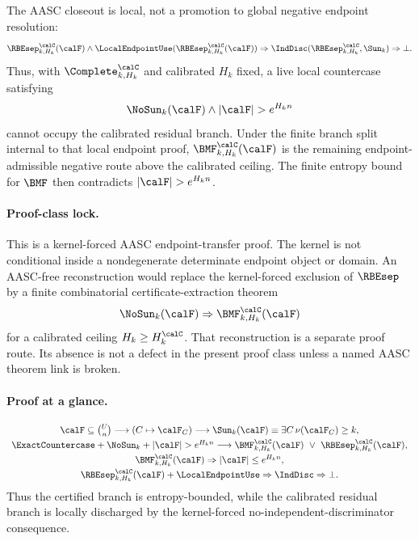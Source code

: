 \documentclass[11pt]{article}
\begin{document}
The AASC closeout is local, not a promotion to global negative endpoint resolution:
\[
  \RBEsep^{\calC}_{k,H_k}(\calF)\wedge \LocalEndpointUse(\RBEsep^{\calC}_{k,H_k}(\calF))
  \Rightarrow
  \IndDisc(\RBEsep^{\calC}_{k,H_k},\Sun_k)
  \Rightarrow \bot.
\]
Thus, with \(\Complete^{\calC}_{k,H_k}\) and calibrated \(H_k\) fixed, a live local countercase satisfying
\[
  \NoSun_k(\calF)\wedge |\calF|>e^{H_k n}
\]
cannot occupy the calibrated residual branch.  Under the finite branch split internal to that local endpoint proof, \(\BMF^{\calC}_{k,H_k}(\calF)\) is the remaining endpoint-admissible negative route above the calibrated ceiling.  The finite entropy bound for \(\BMF\) then contradicts \(|\calF|>e^{H_k n}\).

\begin{center}
\end{center}

\paragraph{Proof-class lock.}
This is a kernel-forced AASC endpoint-transfer proof.  The kernel is not conditional inside a nondegenerate determinate endpoint object or domain.  An AASC-free reconstruction would replace the kernel-forced exclusion of \(\RBEsep\) by a finite combinatorial certificate-extraction theorem
\[
  \NoSun_k(\calF)\Rightarrow \BMF^{\calC}_{k,H_k}(\calF)
\]
for a calibrated ceiling \(H_k\ge H_k^{\calC}\).  That reconstruction is a separate proof route.  Its absence is not a defect in the present proof class unless a named AASC theorem link is broken.

\paragraph{Proof at a glance.}
\[
\begin{array}{c}
\calF\subseteq\binom{U}{n}
\longrightarrow
(C\mapsto\calF_C)
\longrightarrow
\Sun_k(\calF)\equiv \exists C\,\nu(\calF_C)\ge k,\\[3pt]
\ExactCountercase+\NoSun_k+|\calF|>e^{H_k n}
\longrightarrow
\BMF^{\calC}_{k,H_k}(\calF)\ \vee\ \RBEsep^{\calC}_{k,H_k}(\calF),\\[3pt]
\BMF^{\calC}_{k,H_k}(\calF)\Rightarrow |\calF|\le e^{H_k n},\\[3pt]
\RBEsep^{\calC}_{k,H_k}(\calF)+\LocalEndpointUse
\Rightarrow \IndDisc\Rightarrow\bot.
\end{array}
\]
Thus the certified branch is entropy-bounded, while the calibrated residual branch is locally discharged by the kernel-forced no-independent-discriminator consequence.
\end{document}
